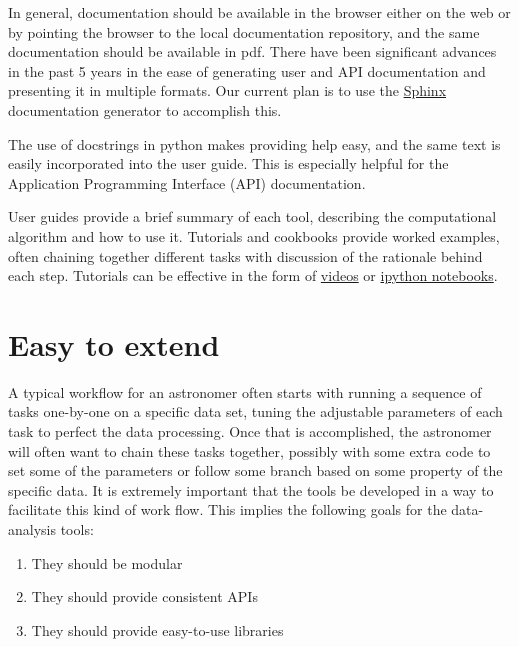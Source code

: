 \documentclass[letterpaper,10pt,english]{sphinxmanual}
\begin{document}
In general, documentation should be available in the browser either on the web
or by pointing the browser to the local documentation repository, and the same
documentation should be available in pdf.  There have been significant advances
in the past 5 years in the ease of generating user and API documentation and
presenting it in multiple formats.  Our current plan is to use the
\href{http://sphinx-doc.org}{Sphinx} documentation generator to accomplish this.

The use of docstrings in python makes providing help easy, and the same text
is easily incorporated into the user guide. This is especially helpful for
the Application Programming Interface (API) documentation.

User guides provide a brief summary of each tool, describing the computational
algorithm and how to use it.  Tutorials and cookbooks provide worked examples,
often chaining together different tasks with discussion of the rationale behind
each step. Tutorials can be effective in the form of
\href{http://www.youtube.com/watch?v=DNRJwENqEUY}{videos}
or
\href{http://nbviewer.ipython.org/urls/raw.github.com/spacetelescope/scientific-python-training-2012/master/lecture\_notebooks/PSF\_Photometry\_Process.ipynb}{ipython notebooks}.


\section{Easy to extend}
\label{intro:easy-to-extend}
A typical workflow for an astronomer often starts with running a sequence
of tasks one-by-one on a specific data set, tuning the adjustable parameters
of each task to perfect the data processing. Once that is accomplished,
the astronomer will often want to chain these tasks together, possibly with
some extra code to set some of the parameters or follow some branch based on some property
of the specific data. It is extremely important that the tools be developed
in a way to facilitate this kind of work flow. This implies the following
goals for the data-analysis tools:
\begin{enumerate}
\item {} 
They should be modular

\item {} 
They should provide consistent APIs

\item {} 
They should provide easy-to-use libraries

\end{enumerate}
\end{document}
